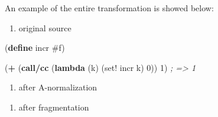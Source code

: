 \documentclass[12pt,a4paper,oneside,openright]{book}
\newenvironment{Shaded}{\begin{snugshade}}{\end{snugshade}}
\newcommand{\KeywordTok}[1]{\textcolor[rgb]{0.13,0.29,0.53}{\textbf{{#1}}}}
\newcommand{\DecValTok}[1]{\textcolor[rgb]{0.00,0.00,0.81}{{#1}}}
\newcommand{\CommentTok}[1]{\textcolor[rgb]{0.56,0.35,0.01}{\textit{{#1}}}}
\newcommand{\FunctionTok}[1]{\textcolor[rgb]{0.00,0.00,0.00}{{#1}}}
\newcommand{\NormalTok}[1]{{#1}}
\providecommand{\tightlist}{%
  \setlength{\itemsep}{0pt}\setlength{\parskip}{0pt}}
\begin{document}
An example of the entire transformation is showed below:

\begin{enumerate}
\def\labelenumi{\arabic{enumi}.}
\tightlist
\item
  original source
\end{enumerate}

\begin{Shaded}
\begin{Highlighting}[]
    \NormalTok{(}\KeywordTok{define}\FunctionTok{ incr }\DecValTok{#f}\NormalTok{)}

    \NormalTok{(}\KeywordTok{+} \NormalTok{(}\KeywordTok{call/cc}
          \NormalTok{(}\KeywordTok{lambda} \NormalTok{(k)}
              \NormalTok{(set! incr k)}
              \DecValTok{0}\NormalTok{))}
      \DecValTok{1}\NormalTok{) }\CommentTok{; => 1}
\end{Highlighting}
\end{Shaded}

\begin{enumerate}
\def\labelenumi{\arabic{enumi}.}
\setcounter{enumi}{1}
\tightlist
\item
  after A-normalization
\end{enumerate}

\begin{Shaded}
\end{Shaded}

\begin{enumerate}
\def\labelenumi{\arabic{enumi}.}
\setcounter{enumi}{2}
\tightlist
\item
  after fragmentation
\end{enumerate}
\end{document}

